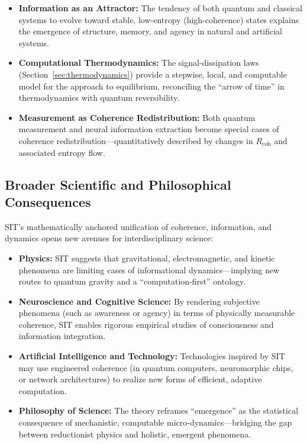 \begin{itemize}
    \item \textbf{Information as an Attractor:}  
    The tendency of both quantum and classical systems to evolve toward stable, low-entropy (high-coherence) states explains the emergence of structure, memory, and agency in natural and artificial systems.
    \item \textbf{Computational Thermodynamics:}  
    The signal-dissipation laws (Section~\ref{sec:thermodynamics}) provide a stepwise, local, and computable model for the approach to equilibrium, reconciling the ``arrow of time'' in thermodynamics with quantum reversibility.
    \item \textbf{Measurement as Coherence Redistribution:}  
    Both quantum measurement and neural information extraction become special cases of coherence redistribution---quantitatively described by changes in $R_{\mathrm{coh}}$ and associated entropy flow.
\end{itemize}

\subsection{Broader Scientific and Philosophical Consequences}

SIT's mathematically anchored unification of coherence, information, and dynamics opens new avenues for interdisciplinary science:

\begin{itemize}
    \item \textbf{Physics:}  
    SIT suggests that gravitational, electromagnetic, and kinetic phenomena are limiting cases of informational dynamics---implying new routes to quantum gravity and a ``computation-first'' ontology.
    \item \textbf{Neuroscience and Cognitive Science:}  
    By rendering subjective phenomena (such as awareness or agency) in terms of physically measurable coherence, SIT enables rigorous empirical studies of consciousness and information integration.
    \item \textbf{Artificial Intelligence and Technology:}  
    Technologies inspired by SIT may use engineered coherence (in quantum computers, neuromorphic chips, or network architectures) to realize new forms of efficient, adaptive computation.
    \item \textbf{Philosophy of Science:}  
    The theory reframes ``emergence'' as the statistical consequence of mechanistic, computable micro-dynamics---bridging the gap between reductionist physics and holistic, emergent phenomena.
\end{itemize}

